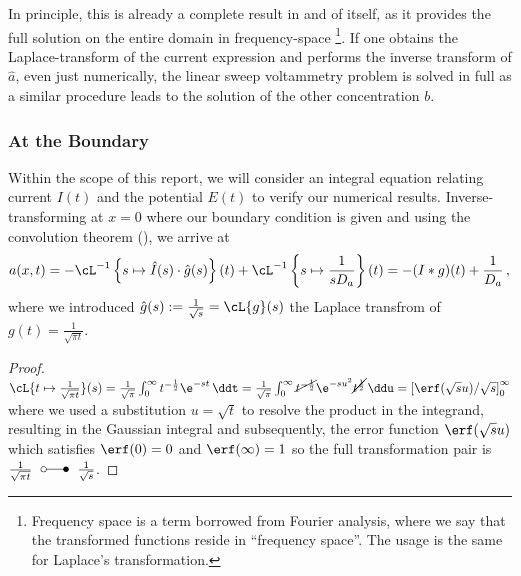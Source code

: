 \documentclass{prettytex/ox/mmsc-special-topic}
\begin{document}
  In principle, this is already a complete result in and of itself, as it provides the full solution on the entire domain in frequency-space \footnote{Frequency space is a term borrowed from Fourier analysis, where we say that the transformed functions reside in ``frequency space''. The usage is the same for Laplace's transformation.}. If one obtains the Laplace-transform of the current expression  and performs the inverse transform of $\hat{a}$, even just numerically, the linear sweep voltammetry problem is solved in full as a similar procedure leads to the solution of the other concentration $b$.

  \subsubsection{At the Boundary}
  Within the scope of this report, we will consider an integral equation relating current $I(t)$ and the potential $E(t)$ to verify our numerical results.
  Inverse-transforming  at $x = 0$ where our boundary condition is given and using the convolution theorem (), we arrive at
  \begin{align*}
    a(x, t) = -\cL^{-1}\left\{s \mapsto \hat{I}(s) \cdot \hat{g}(s)\right\}(t) + \cL^{-1}\left\{s \mapsto \frac{1}{s D_a}\right\}(t) = -(I * g)(t) + \frac{1}{D_a}\,,
  \end{align*}
  where we introduced $\hat{g}(s) := \frac{1}{\sqrt{s}} = \cL\{g\}(s)$ the Laplace transfrom of $g(t) = \frac{1}{\sqrt{\pi t}}$.
  \begin{proof}
    $\cL\{t \mapsto \frac{1}{\sqrt{\pi t}}\}(s) = \frac{1}{\sqrt{\pi}} \int_0^\infty t^{-\frac{1}{2}} \e^{-st} \,\ddt = \frac{1}{\sqrt{\pi}} \int_0^\infty \cancel{t^{-\frac{1}{2}}} \e^{-su^2} \cancel{t^{\frac{1}{2}}}\,\ddu = \left[\erf(\sqrt{s} u) / \sqrt{s}\right]_0^\infty$ where we used a substitution $u = \sqrt{t}$ to resolve the product in the integrand, resulting in the Gaussian integral and subsequently, the error function $\erf(\sqrt{s}u)$ which satisfies $\erf(0) = 0$ and $\erf(\infty) = 1$ so the full transformation pair is $\frac{1}{\sqrt{\pi t}} \;\laplace\; \frac{1}{\sqrt{s}}$.
  \end{proof}
\end{document}
